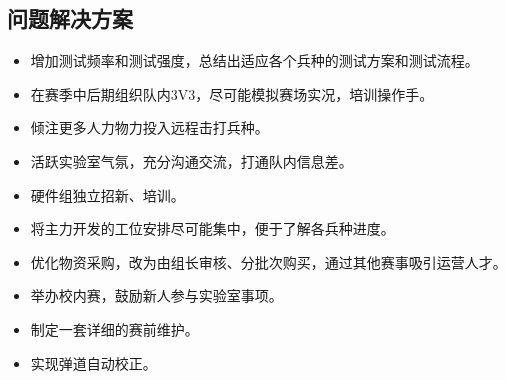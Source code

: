 \subsection{问题解决方案}


    \begin{itemize}
        \item 增加测试频率和测试强度，总结出适应各个兵种的测试方案和测试流程。
        \item 在赛季中后期组织队内3V3，尽可能模拟赛场实况，培训操作手。
        \item 倾注更多人力物力投入远程击打兵种。
        \item 活跃实验室气氛，充分沟通交流，打通队内信息差。
        \item 硬件组独立招新、培训。
        \item 将主力开发的工位安排尽可能集中，便于了解各兵种进度。
        \item 优化物资采购，改为由组长审核、分批次购买，通过其他赛事吸引运营人才。
        \item 举办校内赛，鼓励新人参与实验室事项。
        \item 制定一套详细的赛前维护。
        \item 实现弹道自动校正。
    \end{itemize}